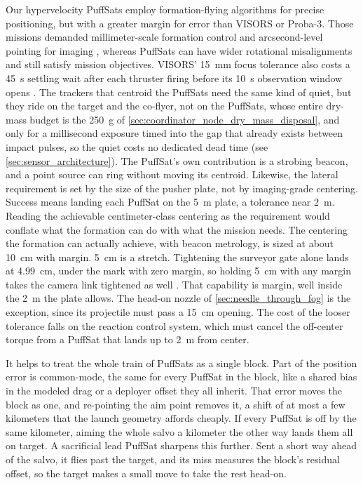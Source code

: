 \documentclass{article}
\begin{document}
Our hypervelocity PuffSats employ formation-flying algorithms for precise positioning, but with a greater margin for error than VISORS or Proba-3. Those missions demanded millimeter-scale formation control and arcsecond-level pointing for imaging \cite{llorente2013proba3}, whereas PuffSats can have wider rotational misalignments and still satisfy mission objectives. VISORS' \SI{15}{\milli\meter} focus tolerance also costs a \SI{45}{\second} settling wait after each thruster firing before its \SI{10}{\second} observation window opens \cite{guffanti2023autonomous}. The trackers that centroid the PuffSats need the same kind of quiet, but they ride on the target and the co-flyer, not on the PuffSats, whose entire dry-mass budget is the \SI{250}{\gram} of \autoref{sec:coordinator_node_dry_mass_disposal}, and only for a millisecond exposure timed into the gap that already exists between impact pulses, so the quiet costs no dedicated dead time (see \autoref{sec:sensor_architecture}). The PuffSat's own contribution is a strobing beacon, and a point source can ring without moving its centroid. Likewise, the lateral requirement is set by the size of the pusher plate, not by imaging-grade centering. Success means landing each PuffSat on the \SI{5}{\meter} plate, a tolerance near \SI{2}{\meter}. Reading the achievable centimeter-class centering as the requirement would conflate what the formation can do with what the mission needs. The centering the formation can actually achieve, with beacon metrology, is sized at about \SI{10}{\centi\meter} with margin. \SI{5}{\centi\meter} is a stretch. Tightening the surveyor gate alone lands at \SI{4.99}{\centi\meter}, under the mark with zero margin, so holding \SI{5}{\centi\meter} with any margin takes the camera link tightened as well \cite{Katz_puffsat_control_sim_2026}. That capability is margin, well inside the \SI{2}{\meter} the plate allows. The head-on nozzle of \autoref{sec:needle_through_fog} is the exception, since its projectile must pass a \SI{15}{\centi\meter} opening. The cost of the looser tolerance falls on the reaction control system, which must cancel the off-center torque from a PuffSat that lands up to \SI{2}{\meter} from center. 

It helps to treat the whole train of PuffSats as a single block. Part of the position error is common-mode, the same for every PuffSat in the block, like a shared bias in the modeled drag or a deployer offset they all inherit. That error moves the block as one, and re-pointing the aim point removes it, a shift of at most a few kilometers that the launch geometry affords cheaply. If every PuffSat is off by the same kilometer, aiming the whole salvo a kilometer the other way lands them all on target. A sacrificial lead PuffSat sharpens this further. Sent a short way ahead of the salvo, it flies past the target, and its miss measures the block's residual offset, so the target makes a small move to take the rest head-on.
\end{document}
